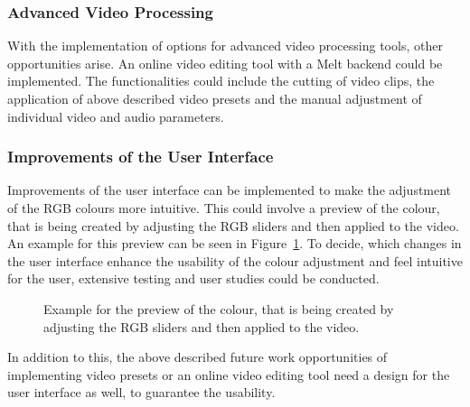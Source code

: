 \documentclass[../MasterThesis.tex]{subfiles}
\begin{document}
\subsubsection*{Advanced Video Processing}

With the implementation of options for advanced video processing tools, other opportunities arise. An online video editing tool with a Melt backend could be implemented. The functionalities could include the cutting of video clips, the application of above described video presets and the manual adjustment of individual video and audio parameters.










\subsubsection*{Improvements of the User Interface}


Improvements of the user interface can be implemented to make the adjustment of the RGB colours more intuitive. This could involve a preview of the colour, that is being created by adjusting the RGB sliders and then applied to the video. An example for this preview can be seen in Figure~\ref{figure:UI}.
To decide, which changes in the user interface enhance the usability of the colour adjustment and feel intuitive for the user, extensive testing and user studies could be conducted.

\begin{figure}[H]
	\begin{center}
		\caption[Example for the colour preview of the RGB sliders.]{Example for the preview of the colour, that is being created by adjusting the RGB sliders and then applied to the video.}
		\label{figure:UI}
	\end{center}
\end{figure}



In addition to this, the above described future work opportunities of implementing video presets or an online video editing tool need a design for the user interface as well, to guarantee the usability. 
\end{document}
